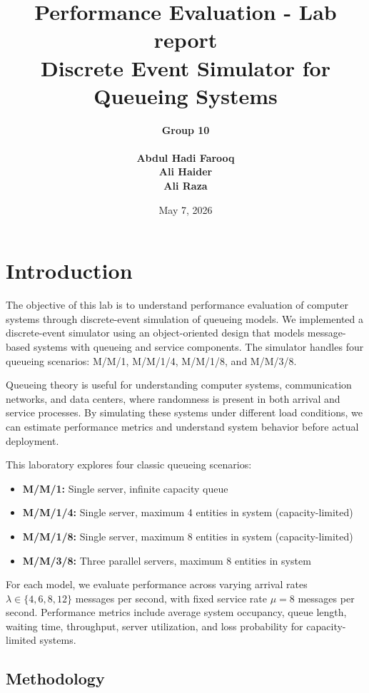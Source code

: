 \documentclass[12pt]{article}
\title{Performance Evaluation - Lab report \\

Discrete Event Simulator for Queueing Systems
}
\author{\bf{Group 10} \\ \\
        Abdul Hadi Farooq \\
        Ali Haider \\
        Ali Raza \\
}
\date{May 7, 2026}
\begin{document}
\maketitle

\section{Introduction}

The objective of this lab is to understand performance evaluation of computer systems through discrete-event simulation of queueing models. We implemented a discrete-event simulator using an object-oriented design that models message-based systems with queueing and service components. The simulator handles four queueing scenarios: M/M/1, M/M/1/4, M/M/1/8, and M/M/3/8.

Queueing theory is useful for understanding computer systems, communication networks, and data centers, where randomness is present in both arrival and service processes. By simulating these systems under different load conditions, we can estimate performance metrics and understand system behavior before actual deployment.

This laboratory explores four classic queueing scenarios:
\begin{itemize}
    \item \textbf{M/M/1:} Single server, infinite capacity queue
    \item \textbf{M/M/1/4:} Single server, maximum 4 entities in system (capacity-limited)
    \item \textbf{M/M/1/8:} Single server, maximum 8 entities in system (capacity-limited)
    \item \textbf{M/M/3/8:} Three parallel servers, maximum 8 entities in system
\end{itemize}

For each model, we evaluate performance across varying arrival rates $\lambda \in \{4, 6, 8, 12\}$ messages per second, with fixed service rate $\mu = 8$ messages per second. Performance metrics include average system occupancy, queue length, waiting time, throughput, server utilization, and loss probability for capacity-limited systems.

\subsection{Methodology}
\end{document}
